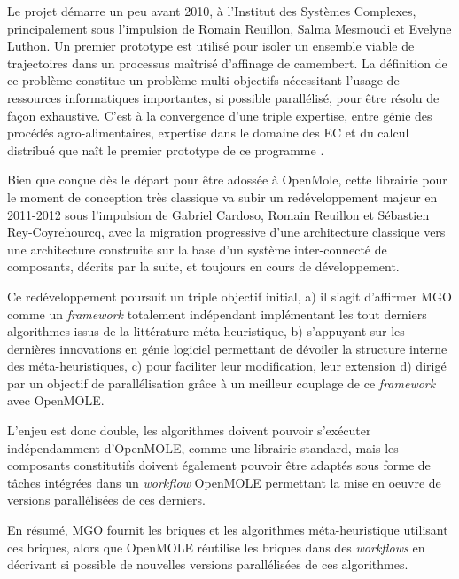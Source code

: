Le projet démarre un peu avant 2010, à l'Institut des Systèmes Complexes, principalement sous l'impulsion de Romain Reuillon, Salma Mesmoudi et Evelyne Luthon. Un premier prototype est utilisé pour isoler un ensemble viable de trajectoires dans un processus maîtrisé d'affinage de camembert. La définition de ce problème constitue un problème multi-objectifs nécessitant l'usage de ressources informatiques importantes, si possible parallélisé, pour être résolu de façon exhaustive. C'est à la convergence d'une triple expertise, entre génie des procédés agro-alimentaires, expertise dans le domaine des EC et du calcul distribué que naît le premier prototype de ce programme \autocite{Mesmoudi2010}.

Bien que conçue dès le départ pour être adossée à OpenMole, cette librairie pour le moment de conception très classique va subir un redéveloppement majeur en 2011-2012 sous l'impulsion de Gabriel Cardoso, Romain Reuillon et Sébastien Rey-Coyrehourcq, avec la migration progressive d'une architecture classique vers une architecture construite sur la base d'un système inter-connecté de composants, décrits par la suite, et toujours en cours de développement.

Ce redéveloppement poursuit un triple objectif initial, a) il s'agit d'affirmer MGO comme un \textit{framework} totalement indépendant implémentant les tout derniers algorithmes issus de la littérature méta-heuristique, b) s'appuyant sur les dernières innovations en génie logiciel permettant de dévoiler la structure interne des méta-heuristiques, c) pour faciliter leur modification, leur extension d) dirigé par un objectif de parallélisation grâce à un meilleur couplage de ce \textit{framework} avec OpenMOLE.


L'enjeu est donc double, les algorithmes doivent pouvoir s'exécuter indépendamment d'OpenMOLE, comme une librairie standard, mais les composants constitutifs doivent également pouvoir être adaptés sous forme de tâches intégrées dans un \textit{workflow} OpenMOLE permettant la mise en oeuvre de versions parallélisées de ces derniers.

En résumé, MGO fournit les briques et les algorithmes méta-heuristique utilisant ces briques, alors que OpenMOLE réutilise les briques dans des \textit{workflows} en décrivant si possible de nouvelles versions parallélisées de ces algorithmes.

